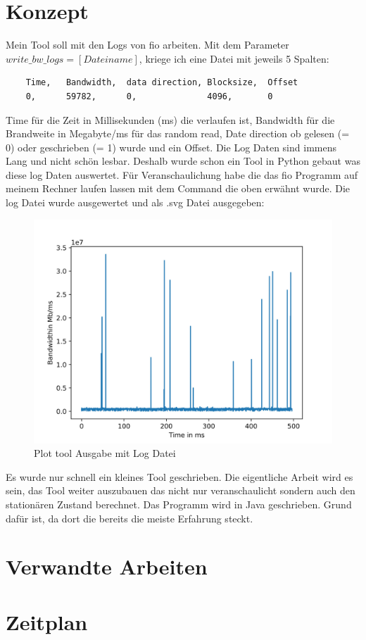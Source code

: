 \documentclass{article}
\begin{document}
\section{Konzept}
Mein Tool soll mit den Logs von fio arbeiten. \newline
Mit dem Parameter $write\_bw\_logs=[Dateiname]$, kriege ich eine Datei mit jeweils 5 Spalten:
\begin{lstlisting}
    Time,	Bandwidth,	data direction, Blocksize,	Offset
    0, 	    59782, 		0,		        4096,		0
\end{lstlisting}
Time für die Zeit in Millisekunden (ms) die verlaufen ist, Bandwidth für die Brandweite in Megabyte/ms
für das random read, Date direction ob gelesen (= 0) oder geschrieben (= 1) wurde
und ein Offset. Die Log Daten sind immens Lang und nicht schön lesbar. Deshalb wurde schon ein Tool in Python gebaut 
was diese log Daten auswertet. Für Veranschaulichung habe die das fio Programm auf meinem Rechner laufen lassen mit dem
Command die oben erwähnt wurde. Die log Datei wurde ausgewertet und als .svg Datei ausgegeben:
\begin{figure}[ht!]
    \centering
    \includegraphics[width=120mm]{./Code/nm_mytest_bw.jpg}
    \caption{Plot tool Ausgabe mit Log Datei  \label{overflow}}
    \end{figure}

Es wurde nur schnell ein kleines Tool geschrieben. Die eigentliche Arbeit wird es sein, das Tool weiter auszubauen das nicht nur veranschaulicht
sondern auch den stationären Zustand berechnet. Das Programm wird in Java geschrieben. Grund dafür ist, da dort die bereits die meiste Erfahrung steckt.
\section{Verwandte Arbeiten}
\section{Zeitplan}
\end{document}
